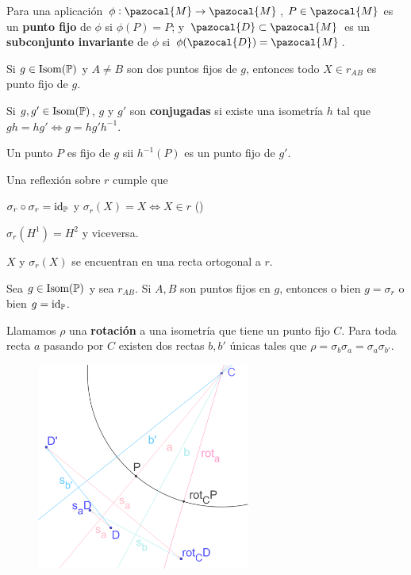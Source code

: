 
 Para una aplicación $\phi: \pazocal{M} \rightarrow \pazocal{M}$, $P\in \pazocal{M}$ es un \textbf{punto fijo} de $\phi$ si $\phi(P) = P$; y $\pazocal{D} \subset \pazocal{M}$ es un \textbf{subconjunto invariante} de $\phi$ si $\phi(\pazocal{D}) = \pazocal{M}$.

 Si $g \in \iso(\P)$ y $A \neq B$ son dos puntos fijos de $g$, entonces todo $X \in r_{AB}$ es punto fijo de $g$.


 Si $g, g' \in \iso(\P)$, $g$ y $g'$ son \textbf{conjugadas}
si existe una isometría $h$ tal que $gh = hg' \iff g = hg'h^{-1}$.

 Un punto $P$ es fijo de $g$ sii $h^{-1}(P)$ es un punto fijo de $g'$.


 Una reflexión sobre $r$ cumple que
\begin{itemizex}
	\item $\sigma_r\circ\sigma_r = \text{id}_{\P}$ y $\sigma_r(X) = X \iff X \in r$ ()
	\item $\sigma_r(H^1) = H^2$ y viceversa.
	\item $X$ y $\sigma_r(X)$ se encuentran en una recta ortogonal a $r$.
\end{itemizex} 

 Sea $g\in \iso(\P)$ y sea $r_{AB}$. Si $A, B$ son puntos fijos en $g$, entonces o bien $g = \sigma_r$ o bien $g = \text{id}_\P$. 

 Llamamos $\rho$ una \textbf{rotación} a una isometría que tiene un punto fijo $C$. Para toda recta $a$ pasando por $C$ existen dos rectas $b, b'$ únicas tales que $\rho = \sigma_b\sigma_a = \sigma_a\sigma_{b'}$.

\begin{figure}[H]
	\centering
	\includegraphics[width=7cm]{figuras/3-9.png}
	\vspace{-1em}
\end{figure}

